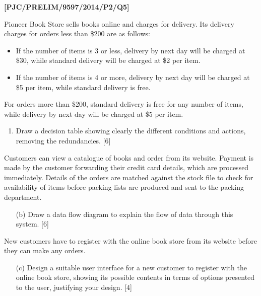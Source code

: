 \item \textbf{{[}PJC/PRELIM/9597/2014/P2/Q5{]} }

Pioneer Book Store sells books online and charges for delivery. Its
delivery charges for orders less than \$200 are as follows: 
\begin{itemize}
\item If the number of items is 3 or less, delivery by next day will be
charged at \$30, while standard delivery will be charged at \$2 per
item. 
\item If the number of items is 4 or more, delivery by next day will be
charged at \$5 per item, while standard delivery is free.
\end{itemize}
For orders more than \$200, standard delivery is free for any number
of items, while delivery by next day will be charged at \$5 per item.
\begin{enumerate}
\item Draw a decision table showing clearly the different conditions and
actions, removing the redundancies.\hfill{} {[}6{]}
\end{enumerate}
Customers can view a catalogue of books and order from its website.
Payment is made by the customer forwarding their credit card details,
which are processed immediately. Details of the orders are matched
against the stock file to check for availability of items before packing
lists are produced and sent to the packing department. 
\begin{enumerate}
\item[(b)]  Draw a data flow diagram to explain the flow of data through this
system.\hfill{} {[}6{]}
\end{enumerate}
New customers have to register with the online book store from its
website before they can make any orders. 
\begin{enumerate}
\item[(c)]  Design a suitable user interface for a new customer to register
with the online book store, showing its possible contents in terms
of options presented to the user, justifying your design. \hfill{}{[}4{]}
\end{enumerate}